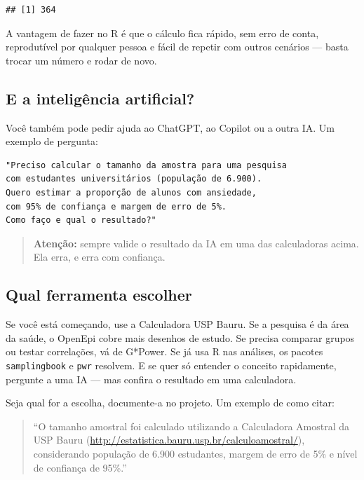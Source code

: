 \documentclass[
]{book}
\begin{document}
\begin{verbatim}
## [1] 364
\end{verbatim}

A vantagem de fazer no R é que o cálculo fica rápido, sem erro de conta, reprodutível por qualquer pessoa e fácil de repetir com outros cenários --- basta trocar um número e rodar de novo.

\subsection{E a inteligência artificial?}\label{e-a-inteliguxeancia-artificial}

Você também pode pedir ajuda ao ChatGPT, ao Copilot ou a outra IA. Um exemplo de pergunta:

\begin{verbatim}
"Preciso calcular o tamanho da amostra para uma pesquisa 
com estudantes universitários (população de 6.900). 
Quero estimar a proporção de alunos com ansiedade, 
com 95% de confiança e margem de erro de 5%. 
Como faço e qual o resultado?"
\end{verbatim}

\begin{quote}
\textbf{Atenção:} sempre valide o resultado da IA em uma das calculadoras acima. Ela erra, e erra com confiança.
\end{quote}

\subsection{Qual ferramenta escolher}\label{qual-ferramenta-escolher}

Se você está começando, use a Calculadora USP Bauru. Se a pesquisa é da área da saúde, o OpenEpi cobre mais desenhos de estudo. Se precisa comparar grupos ou testar correlações, vá de G*Power. Se já usa R nas análises, os pacotes \texttt{samplingbook} e \texttt{pwr} resolvem. E se quer só entender o conceito rapidamente, pergunte a uma IA --- mas confira o resultado em uma calculadora.

Seja qual for a escolha, documente-a no projeto. Um exemplo de como citar:

\begin{quote}
``O tamanho amostral foi calculado utilizando a Calculadora Amostral da USP Bauru (\url{http://estatistica.bauru.usp.br/calculoamostral/}), considerando população de 6.900 estudantes, margem de erro de 5\% e nível de confiança de 95\%.''
\end{quote}
\end{document}

